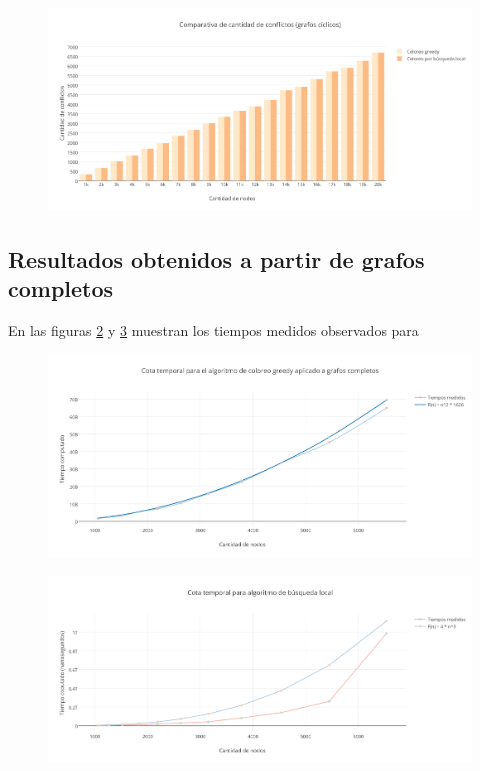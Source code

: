  \begin{figure}[H]
    \begin{center}
  	\includegraphics[width=18cm]{imagenes/Ej5/ComparacionConflictosCiclico.png}
 	\label{ComparacionConflictosCiclico}
    \end{center}
  \end{figure}


\subsection {Resultados obtenidos a partir de grafos completos} 

En las figuras \ref{TiempoGreedyCompleto} y \ref{TiemposLocalCompleto} muestran los tiempos medidos observados para 

 \begin{figure}[H]
    \begin{center}
  	\includegraphics[width=18cm]{imagenes/Ej5/TiempoGreedyCompleto.png}
 	\label{TiempoGreedyCompleto}
    \end{center}
  \end{figure}

 \begin{figure}[H]
    \begin{center}
  	\includegraphics[width=18cm]{imagenes/Ej5/TiemposLocalCompleto.png}
 	\label{TiemposLocalCompleto}
    \end{center}
  \end{figure}

